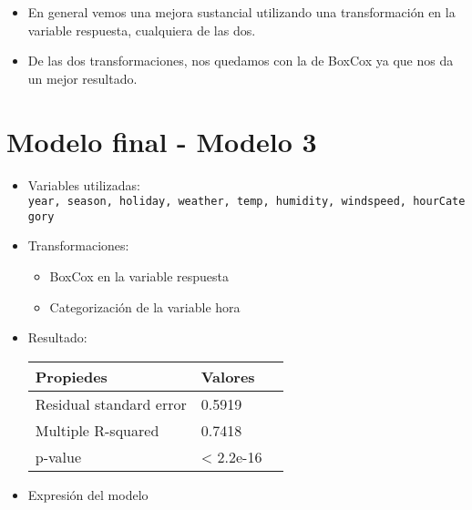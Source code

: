 \documentclass[
]{article}
\providecommand{\tightlist}{%
  \setlength{\itemsep}{0pt}\setlength{\parskip}{0pt}}
\begin{document}
\begin{itemize}
\tightlist
\item
  En general vemos una mejora sustancial utilizando una transformación
  en la variable respuesta, cualquiera de las dos.
\item
  De las dos transformaciones, nos quedamos con la de BoxCox ya que nos
  da un mejor resultado.
\end{itemize}

\hypertarget{modelo-final---modelo-3}{%
\section{Modelo final - Modelo 3}\label{modelo-final---modelo-3}}

\begin{itemize}
\item
  Variables utilizadas:
  \texttt{year,\ season,\ holiday,\ weather,\ temp,\ humidity,\ windspeed,\ hourCategory}
\item
  Transformaciones:

  \begin{itemize}
  \tightlist
  \item
    BoxCox en la variable respuesta
  \item
    Categorización de la variable hora
  \end{itemize}
\item
  Resultado:

  \begin{longtable}[]{@{}lll@{}}
  \toprule
  Propiedes & Valores &\tabularnewline
  \midrule
  \endhead
  Residual standard error & 0.5919 &\tabularnewline
  Multiple R-squared & 0.7418 &\tabularnewline
  p-value & \textless{} 2.2e-16 &\tabularnewline
  \bottomrule
  \end{longtable}
\item
  Expresión del modelo
\end{itemize}
\end{document}
